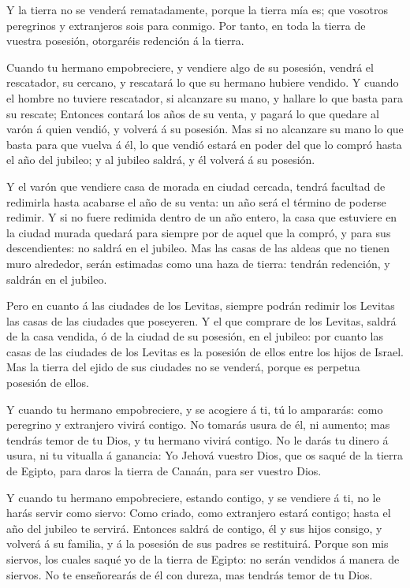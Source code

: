  Y la tierra no se venderá rematadamente, porque la tierra
mía es; que vosotros peregrinos y extranjeros sois para conmigo.
 Por tanto, en toda la tierra de vuestra posesión,
otorgaréis redención á la tierra.

 Cuando tu hermano empobreciere, y vendiere algo de su
posesión, vendrá el rescatador, su cercano, y rescatará lo que su
hermano hubiere vendido.  Y cuando el hombre no tuviere
rescatador, si alcanzare su mano, y hallare lo que basta para su
rescate;  Entonces contará los años de su venta, y pagará
lo que quedare al varón á quien vendió, y volverá á su posesión.
 Mas si no alcanzare su mano lo que basta para que vuelva á
él, lo que vendió estará en poder del que lo compró hasta el año del
jubileo; y al jubileo saldrá, y él volverá á su posesión.

 Y el varón que vendiere casa de morada en ciudad cercada,
tendrá facultad de redimirla hasta acabarse el año de su venta: un año
será el término de poderse redimir.  Y si no fuere redimida
dentro de un año entero, la casa que estuviere en la ciudad murada
quedará para siempre por de aquel que la compró, y para sus
descendientes: no saldrá en el jubileo.  Mas las casas de
las aldeas que no tienen muro alrededor, serán estimadas como una haza
de tierra: tendrán redención, y saldrán en el jubileo.

 Pero en cuanto á las ciudades de los Levitas, siempre
podrán redimir los Levitas las casas de las ciudades que poseyeren.
 Y el que comprare de los Levitas, saldrá de la casa
vendida, ó de la ciudad de su posesión, en el jubileo: por cuanto las
casas de las ciudades de los Levitas es la posesión de ellos entre los
hijos de Israel.  Mas la tierra del ejido de sus ciudades
no se venderá, porque es perpetua posesión de ellos.

 Y cuando tu hermano empobreciere, y se acogiere á ti, tú
lo ampararás: como peregrino y extranjero vivirá contigo. 
No tomarás usura de él, ni aumento; mas tendrás temor de tu Dios, y tu
hermano vivirá contigo.  No le darás tu dinero á usura, ni
tu vitualla á ganancia:  Yo Jehová vuestro Dios, que os
saqué de la tierra de Egipto, para daros la tierra de Canaán, para ser
vuestro Dios.

 Y cuando tu hermano empobreciere, estando contigo, y se
vendiere á ti, no le harás servir como siervo:  Como
criado, como extranjero estará contigo; hasta el año del jubileo te
servirá.  Entonces saldrá de contigo, él y sus hijos
consigo, y volverá á su familia, y á la posesión de sus padres se
restituirá.  Porque son mis siervos, los cuales saqué yo de
la tierra de Egipto: no serán vendidos á manera de siervos.
 No te enseñorearás de él con dureza, mas tendrás temor de
tu Dios.

